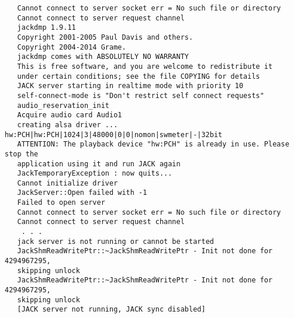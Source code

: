 \begin{verbatim}
   Cannot connect to server socket err = No such file or directory
   Cannot connect to server request channel
   jackdmp 1.9.11
   Copyright 2001-2005 Paul Davis and others.
   Copyright 2004-2014 Grame.
   jackdmp comes with ABSOLUTELY NO WARRANTY
   This is free software, and you are welcome to redistribute it
   under certain conditions; see the file COPYING for details
   JACK server starting in realtime mode with priority 10
   self-connect-mode is "Don't restrict self connect requests"
   audio_reservation_init
   Acquire audio card Audio1
   creating alsa driver ... hw:PCH|hw:PCH|1024|3|48000|0|0|nomon|swmeter|-|32bit
   ATTENTION: The playback device "hw:PCH" is already in use. Please stop the
   application using it and run JACK again
   JackTemporaryException : now quits...
   Cannot initialize driver
   JackServer::Open failed with -1
   Failed to open server
   Cannot connect to server socket err = No such file or directory
   Cannot connect to server request channel
    . . .
   jack server is not running or cannot be started
   JackShmReadWritePtr::~JackShmReadWritePtr - Init not done for 4294967295,
   skipping unlock
   JackShmReadWritePtr::~JackShmReadWritePtr - Init not done for 4294967295,
   skipping unlock
   [JACK server not running, JACK sync disabled]
\end{verbatim}



